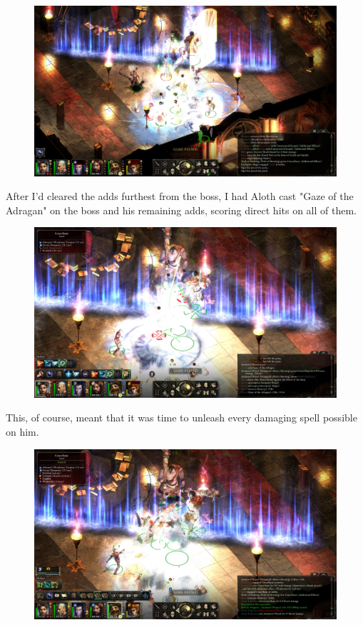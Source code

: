\documentclass{article}
\begin{document}
\begin{figure}
\includegraphics[scale=0.33]{files/blog/2019_08_17_poe_potd_wmpt1/2019_08_17_concelhaut_4.jpg}
\end{figure}

After I'd cleared the adds furthest from the boss, I had Aloth cast "Gaze of the Adragan" on the boss and his remaining adds, scoring direct hits on all of them.

\begin{figure}
\includegraphics[scale=0.33]{files/blog/2019_08_17_poe_potd_wmpt1/2019_08_17_concelhaut_5.jpg}
\end{figure}

This, of course, meant that it was time to unleash every damaging spell possible on him.

\begin{figure}
\includegraphics[scale=0.33]{files/blog/2019_08_17_poe_potd_wmpt1/2019_08_17_concelhaut_6.jpg}
\end{figure}
\end{document}
